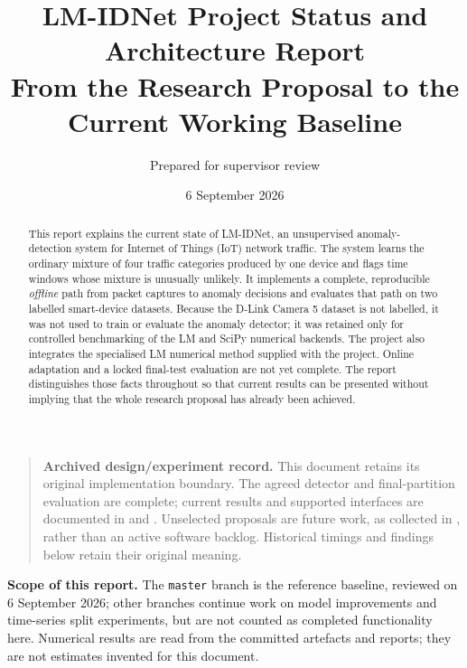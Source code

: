 \documentclass[11pt,a4paper]{article}
\title{\textbf{LM-IDNet Project Status and Architecture Report}\\
\large From the Research Proposal to the Current Working Baseline}
\author{Prepared for supervisor review}
\date{6 September 2026}
\newcommand{\projectname}{LM-IDNet}
\begin{document}
\maketitle

\begin{quote}
\textbf{Archived design/experiment record.} This document retains its original
implementation boundary. The agreed detector and final-partition evaluation
are complete; current results and supported interfaces are documented in
 and
. Unselected proposals are future
work, as collected in , rather than an active software
backlog. Historical timings and findings below retain their original meaning.
\end{quote}

\thispagestyle{empty}

\begin{abstract}
This report explains the current state of \projectname{}, an unsupervised anomaly-detection system for Internet of Things (IoT) network traffic. The system learns the ordinary mixture of four traffic categories produced by one device and flags time windows whose mixture is unusually unlikely. It implements a complete, reproducible \emph{offline} path from packet captures to anomaly decisions and evaluates that path on two labelled smart-device datasets. Because the D-Link Camera 5 dataset is not labelled, it was not used to train or evaluate the anomaly detector; it was retained only for controlled benchmarking of the LM and SciPy numerical backends. The project also integrates the specialised LM numerical method supplied with the project. Online adaptation and a locked final-test evaluation are not yet complete. The report distinguishes those facts throughout so that current results can be presented without implying that the whole research proposal has already been achieved.
\end{abstract}

\vfill
\begin{center}
\begin{minipage}{0.88\textwidth}
\small
\textbf{Scope of this report.} The \texttt{master} branch is the reference baseline, reviewed on 6 September 2026; other branches continue work on model improvements and time-series split experiments, but are not counted as completed functionality here. Numerical results are read from the committed artefacts and reports; they are not estimates invented for this document.
\end{minipage}
\end{center}
\end{document}
